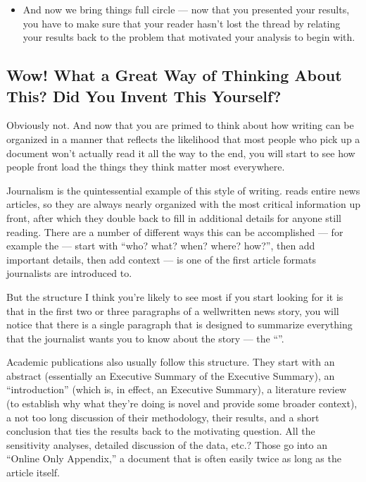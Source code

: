 \documentclass[letterpaper,10pt,english]{jupyterBook}
\begin{document}
\begin{itemize}
\begin{itemize}
\end{itemize}

\item {} 
\sphinxAtStartPar
{} And now we bring things full circle — now that you presented your results, you have to make sure that your reader hasn’t lost the thread by relating your results back to the problem that motivated your analysis to begin with.

\end{itemize}


\subsection{Wow! What a Great Way of Thinking About This? Did You Invent This Yourself?}
\label{\detokenize{40_in_practice/25_writing_to_stakeholders:wow-what-a-great-way-of-thinking-about-this-did-you-invent-this-yourself}}
\sphinxAtStartPar
Obviously not. And now that you are primed to think about how writing can be organized in a manner that reflects the likelihood that most people who pick up a document won’t actually read it all the way to the end, you will start to see how people front load the things they think matter most everywhere.

\sphinxAtStartPar
Journalism is the quintessential example of this style of writing.  reads entire news articles, so they are always nearly organized with the most critical information up front, after which they double back to fill in additional details for anyone still reading. There are a number of different ways this can be accomplished — for example the  — start with “who? what? when? where? how?”, then add important details, then add context — is one of the first article formats journalists are introduced to.

\sphinxAtStartPar
But the structure I think you’re likely to see most if you start looking for it is that in the first two or three paragraphs of a well\sphinxhyphen{}written news story, you will notice that there is a single paragraph that is designed to summarize everything that the journalist wants you to know about the story — the “”.

\sphinxAtStartPar
Academic publications also usually follow this structure. They start with an abstract (essentially an Executive Summary of the Executive Summary), an “introduction” (which is, in effect, an Executive Summary), a literature review (to establish why what they’re doing is novel and provide some broader context), a not too long discussion of their methodology, their results, and a short conclusion that ties the results back to the motivating question. All the sensitivity analyses, detailed discussion of the data, etc.? Those go into an “Online Only Appendix,” a document that is often easily twice as long as the article itself.
\end{document}
